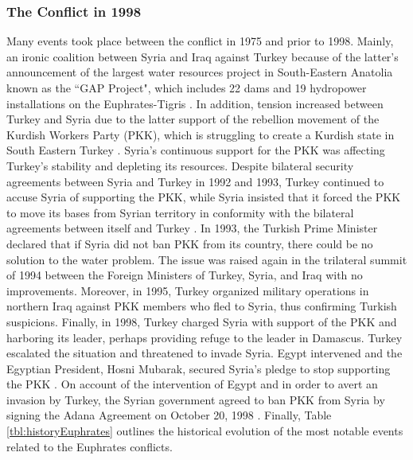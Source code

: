 \documentclass[letterpaper,12pt,titlepage,oneside,final]{book}
\begin{document}
\subsubsection{The Conflict in 1998}
Many events took place between the conflict in 1975 and prior to 1998. Mainly, an ironic coalition between Syria and Iraq against Turkey because of the latter's announcement of the largest water resources project in South-Eastern Anatolia known as the ``GAP Project", which includes 22 dams and 19 hydropower installations on the Euphrates-Tigris \citep{frenken2009irrigation}. In addition, tension increased between Turkey and Syria due to the latter support of the rebellion movement of the Kurdish Workers Party (PKK), which is struggling to create a Kurdish state in South Eastern Turkey \citep{guner1998signalling}. Syria's continuous support for the PKK was affecting Turkey's stability and depleting its resources. Despite bilateral security agreements between Syria and Turkey in 1992 and 1993, Turkey continued to accuse Syria of supporting the PKK, while Syria insisted that it forced the PKK to move its bases from Syrian territory in conformity with the bilateral agreements between itself and Turkey \citep{guner1998signalling}. In 1993, the Turkish Prime Minister declared that if Syria did not ban PKK from its country, there could be no solution to the water problem. The issue was raised again in the trilateral summit of 1994 between the Foreign Ministers of Turkey, Syria, and Iraq with no improvements. Moreover, in 1995, Turkey organized military operations in northern Iraq against PKK members who fled to Syria, thus confirming Turkish suspicions. Finally, in 1998, Turkey charged Syria with support of the PKK and harboring its leader, perhaps providing refuge to the leader in Damascus. Turkey escalated the situation and threatened to invade Syria. Egypt intervened and the Egyptian President, Hosni Mubarak, secured Syria's pledge to stop supporting the PKK \citep{akanda2007tigris}. On account of the intervention of Egypt and in order to avert an invasion by Turkey, the Syrian government agreed to ban PKK from Syria by signing the Adana Agreement on October 20, 1998 \citep{priscoli2009managing}. Finally, Table \ref{tbl:historyEuphrates} outlines the historical evolution of the most notable events related to the Euphrates conflicts.
\end{document}
